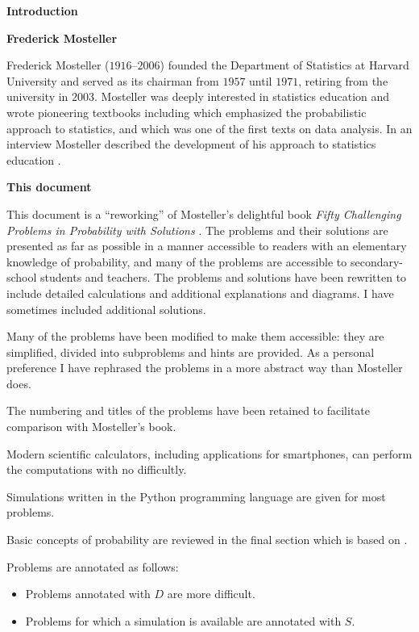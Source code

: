 \begin{center}
\textbf{\LARGE Introduction}
\end{center}


\bigskip

\textbf{Frederick Mosteller}

Frederick Mosteller ($1916$--$2006$) founded the Department of Statistics at Harvard University and served as its chairman from $1957$ until $1971$, retiring from the university in $2003$. Mosteller was deeply interested in statistics education and wrote pioneering textbooks including \cite{pwsa} which emphasized the probabilistic approach to statistics, and \cite{bsda} which was one of the first texts on data analysis. In an interview Mosteller described the development of his approach to statistics education \cite{gse}.

\medskip

\textbf{This document}

This document is a ``reworking'' of Mosteller's delightful book \textit{Fifty Challenging Problems in Probability with Solutions} \cite{fifty}. The problems and their solutions are presented as far as possible in a manner accessible to readers with an elementary knowledge of probability, and many of the problems are accessible to secondary-school students and teachers. The problems and solutions have been rewritten to include detailed calculations and additional explanations and diagrams. I have sometimes included additional solutions.

Many of the problems have been modified to make them accessible: they are simplified, divided into subproblems and hints are provided. As a personal preference I have rephrased the problems in a more abstract way than Mosteller does.

The numbering and titles of the problems have been retained to facilitate comparison with Mosteller's book.

Modern scientific calculators, including applications for smartphones, can perform the computations with no difficultly.

Simulations written in the Python programming language are given for most problems.

Basic concepts of probability are reviewed in the final section which is based on \cite{ross}.

Problems are annotated as follows:
\begin{itemize}
\item Problems annotated with $D$ are more difficult.
\item Problems for which a simulation is available are annotated with $S$.
\end{itemize}

